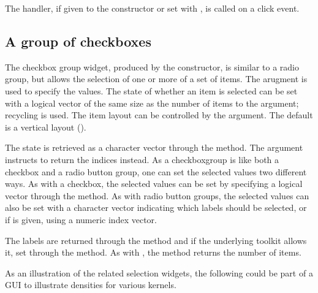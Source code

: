 The handler, if given to the constructor or set with , is called on a click event.

\subsection{A group of checkboxes}
\label{sec:gWidgets-group-checkboxes}


The checkbox group widget, produced by the
 constructor, is similar to a radio group,
but allows the selection of one or more of a set of items.  The
 arugment is used to specify the
values. The state of whether an item is selected can be set with a
logical vector of the same size as the number of items to the
 argument; recycling is used. The
item layout can be controlled by the
 argument. The default is a
vertical layout ().

The state is retrieved as a character vector through the
 method. The  argument
instructs  to return the indices instead. As a
checkboxgroup is like both a checkbox and a radio button group, one
can set the selected values two different ways. As with a checkbox, 
the selected values can be set by specifying a logical vector through the
 method. As with radio button groups,
the selected values can also be set with a character vector indicating
which labels should be selected, or if  is given,
using a numeric index vector.

The labels are returned through the \method{[}{gcheckboxgroup} method
and if the underlying toolkit allows it, set through the
\method{[\ASSIGN}{gcheckboxgroup} method. As with ,
the  method returns the number of items.

As an illustration of the related selection widgets, the following
could be part of a GUI to illustrate densities for various kernels.
\begin{Schunk}
\end{Schunk}

